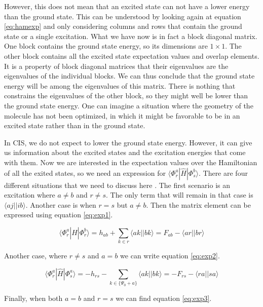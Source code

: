 However, this does not mean that an excited state can not have a lower energy than the ground state. This can be understood by looking again at equation \eqref{eq:hamexp} and only
considering columns and rows that contain the ground state or a single excitation. What we have now is in fact a block diagonal matrix. One block contains the ground state energy, so
its dimensions are $1\times 1 $. The other block contains all the excited state expectation values and overlap elements. It is a property of block diagonal matrices that their
eigenvalues are the eigenvalues of the individual blocks. We can thus conclude that the ground state energy will be among the eigenvalues of this matrix. There is nothing that
constrains the eigenvalues of the other block, so they might well be lower than the ground state energy. One can imagine a situation where the geometry of the molecule has not been
optimized, in which it might be favorable to be in an excited state rather than in the ground state.

In CIS, we do not expect to lower the ground state energy. However, it can give us information about the
excited states and the excitation energies that come with them. Now we are interested in the expectation values over the Hamiltonian of all the exited states, so we need an expression
for $\langle \Phi_r^a |\hat{H}| \Phi_s^b \rangle$. There are four different situations that we need to discuss here \cite{Sherrill1996}. The first scenario is an excitation where
$a \neq b$ and $r \neq s$. The only term that will remain in that case is $\langle aj || ib \rangle$. Another case is when $r = s$ but $a \neq b$. Then the matrix element can be
expressed using equation \eqref{eq:exp1}.

\begin{equation}\label{eq:exp1}
  \langle \Phi_r^a|\hat{H}|\Phi^b_r \rangle = h_{ab} + \sum_{k\in r} \langle ak || bk \rangle = F_{ab} - \langle ar||br \rangle
\end{equation}

Another case, where $r \neq s$ and $a = b$ we can write equation \eqref{eq:exp2}.

\begin{equation}\label{eq:exp2}
  \langle \Phi_r^a|\hat{H}|\Phi^a_s \rangle = -h_{rs} - \sum_{k \in \{\Psi_0 + a\}} \langle ak || bk \rangle = -F_{rs} - \langle ra || sa \rangle
\end{equation}

Finally, when both $a = b$ and $r = s$ we can find equation \eqref{eq:exp3}.

